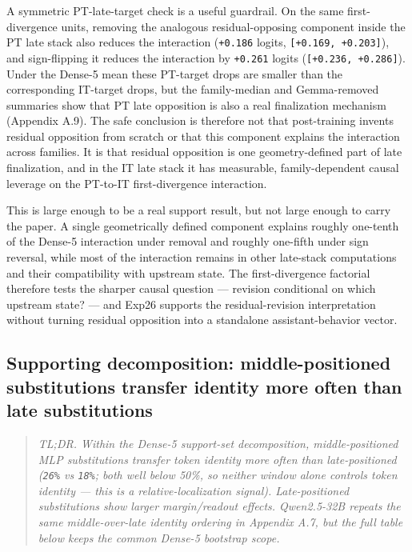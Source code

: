 \documentclass[11pt]{article}
\begin{document}
A symmetric PT-late-target check is a useful guardrail. On the same first-divergence units, removing the analogous residual-opposing component inside the PT late stack also reduces the interaction (\texttt{+0.186} logits, \texttt{[+0.169, +0.203]}), and sign-flipping it reduces the interaction by \texttt{+0.261} logits (\texttt{[+0.236, +0.286]}). Under the Dense-5 mean these PT-target drops are smaller than the corresponding IT-target drops, but the family-median and Gemma-removed summaries show that PT late opposition is also a real finalization mechanism (Appendix A.9). The safe conclusion is therefore not that post-training invents residual opposition from scratch or that this component explains the interaction across families. It is that residual opposition is one geometry-defined part of late finalization, and in the IT late stack it has measurable, family-dependent causal leverage on the PT-to-IT first-divergence interaction.

This is large enough to be a real support result, but not large enough to carry the paper. A single geometrically defined component explains roughly one-tenth of the Dense-5 interaction under removal and roughly one-fifth under sign reversal, while most of the interaction remains in other late-stack computations and their compatibility with upstream state. The first-divergence factorial therefore tests the sharper causal question --- revision conditional on which upstream state? --- and Exp26 supports the residual-revision interpretation without turning residual opposition into a standalone assistant-behavior vector.

\subsection{Supporting decomposition: middle-positioned substitutions transfer identity more often than late substitutions}

\begin{quote}
\emph{TL;DR. Within the Dense-5 support-set decomposition, middle-positioned MLP substitutions transfer token identity more often than late-positioned (\texttt{26\%} vs \texttt{18\%}; both well below 50\%, so neither window alone controls token identity --- this is a relative-localization signal). Late-positioned substitutions show larger margin/readout effects. Qwen2.5-32B repeats the same middle-over-late identity ordering in Appendix A.7, but the full table below keeps the common Dense-5 bootstrap scope.}
\end{quote}
\end{document}
